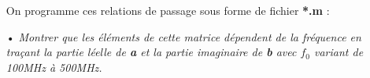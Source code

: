 \documentclass[10pt]{article}
\begin{document}
\begin{itemize}
        On programme ces relations de passage sous forme de fichier \textbf{*.m} :


    \item[•] \textit{Montrer que les éléments de cette matrice dépendent de la fréquence en traçant la partie léelle de \textbf{a} et la partie imaginaire de \textbf{b} avec \textbf{$f_0$} variant de 100MHz à 500MHz.}


\end{itemize}

\subsection{}
\end{document}
